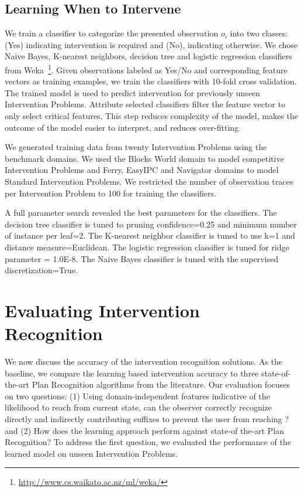 \subsection{Learning When to Intervene}
\label{sec:learning-to-intervene}
We train a classifier to categorize the presented observation $o_i$ into two classes: (Yes) indicating intervention is required and (No), indicating otherwise. 
We chose Naive Bayes, K-nearest neighbors, decision tree and logistic regression classifiers from Weka~\footnote{\url{http://www.cs.waikato.ac.nz/ml/weka/}}. 
Given observations labeled as Yes/No and corresponding feature vectors as training examples, we train the classifiers with 10-fold cross validation. 
The trained model is used to predict intervention for previously unseen Intervention Problems. 
Attribute selected classifiers filter the feature vector to only select critical features. 
This step reduces complexity of the model, makes the outcome of the model easier to interpret, and reduces over-fitting. 

We generated training data from twenty Intervention Problems using the benchmark domains. We used the Blocks World domain to model competitive Intervention Problems and Ferry, EasyIPC and Navigator domains to model Standard Intervention Problems.
We restricted the number of observation traces per Intervention Problem to 100 for training the classifiers.
 
A full parameter search revealed the best parameters for the classifiers. 
The decision tree classifier is tuned to pruning confidence=0.25 and minimum number of instance per leaf=2. 
The K-nearest neighbor classifier is tuned to use k=1 and distance measure=Euclidean. 
The logistic regression classifier is tuned for ridge parameter = 1.0E-8. 
The Naive Bayes classifier is tuned with the supervised discretization=True.
%
\section{Evaluating Intervention Recognition}
\label{sec:evaluating-intervention}
We now discuss the accuracy of the intervention recognition solutions.
As the baseline, we compare the learning based intervention accuracy to three state-of-the-art Plan Recognition algorithms from the literature. 
Our evaluation focuses on two questions: (1) Using domain-independent features indicative of the likelihood to reach \undesired from current state, can the observer correctly recognize directly and indirectly contributing suffixes to prevent the user from reaching \undesired? and (2) How does the learning approach perform against state-of the-art Plan Recognition? 
To address the first question, we evaluated the performance of the learned model on unseen Intervention Problems.

